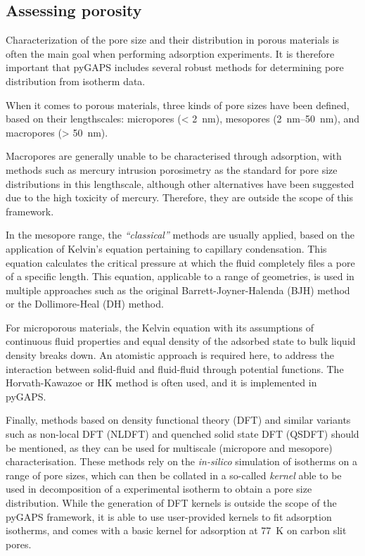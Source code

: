 \subsection{Assessing porosity}

Characterization of the pore size and their distribution in porous materials
is often the main goal when performing adsorption experiments. It is 
therefore important that pyGAPS includes several robust methods 
for determining pore distribution from isotherm data.

When it comes to porous materials, three kinds of pore sizes have been
defined, based on their lengthscales: micropores (\SI{< 2}{\nano\metre}),
mesopores (\SIrange{2}{50}{\nano\metre}), and macropores (\SI{> 50}{\nano\metre}).

Macropores are generally unable to be characterised through adsorption, with 
methods such as mercury intrusion porosimetry as the standard for pore
size distributions in this lengthscale, although other alternatives have 
been suggested~\cite{rouquerolCharacterizationMacroporousSolids2012} due
to the high toxicity of mercury. Therefore, they are outside the scope
of this framework.

In the mesopore range, the \textit{``classical''} methods are usually applied,
based on the application of Kelvin's equation pertaining to capillary 
condensation. This equation calculates the critical pressure at which 
the fluid completely files a pore of a specific length. This equation,
applicable to a range of geometries, is used in multiple approaches
such as the original Barrett-Joyner-Halenda (BJH) method or the 
Dollimore-Heal (DH) method.

For microporous materials, the Kelvin equation with its assumptions 
of continuous fluid properties and equal density of the adsorbed 
state to bulk liquid density breaks down. An atomistic approach
is required here, to address the interaction between solid-fluid
and fluid-fluid through potential functions. The Horvath-Kawazoe or 
HK method is often used, and it is implemented in pyGAPS.

Finally, methods based on density functional theory (DFT) and similar
variants such as non-local DFT (NLDFT) and quenched solid state DFT
(QSDFT) should be mentioned, as they can be used for multiscale
(micropore and mesopore) characterisation. These methods rely on the
\textit{in-silico} simulation of isotherms on a range of pore sizes,
which can then be collated in a so-called \textit{kernel} able to
be used in decomposition of a experimental isotherm to obtain a 
pore size distribution. While the generation of DFT kernels is 
outside the scope of the pyGAPS framework, it is able to use 
user-provided kernels to fit adsorption isotherms, and comes with 
a basic kernel for  adsorption at \SI{77}{\kelvin} on carbon slit pores.

